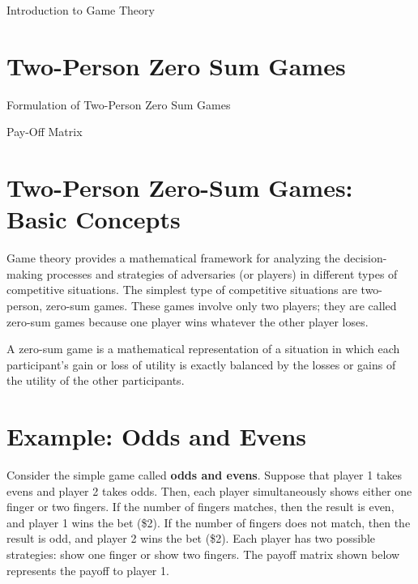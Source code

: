 

Introduction to Game Theory






\section{Two-Person Zero Sum Games}

Formulation of Two-Person Zero Sum Games

Pay-Off Matrix




\section{Two-Person Zero-Sum Games: Basic Concepts}

Game theory provides a mathematical framework for analyzing the decision-making processes and strategies of adversaries (or players) in different types of competitive situations. The simplest type of competitive situations are two-person, zero-sum games. These games involve only two players; they are called zero-sum games because one player wins whatever the other player loses.


\begin{framed}
A zero-sum game is a mathematical representation of a situation in which each participant's gain or loss of utility is exactly balanced by the losses or gains of the utility of the other participants.
\end{framed}

\section{Example: Odds and Evens}
Consider the simple game called \textbf{odds and evens}. Suppose that player 1 takes evens and player 2 takes odds. Then, each player simultaneously shows either one finger or two fingers. If the number of fingers matches, then the result is even, and player 1 wins the bet (\$2). If the number of fingers does not match, then the result is odd, and player 2 wins the bet (\$2). Each player has two possible strategies: show one finger or show two fingers. The payoff matrix shown below represents the payoff to player 1.

